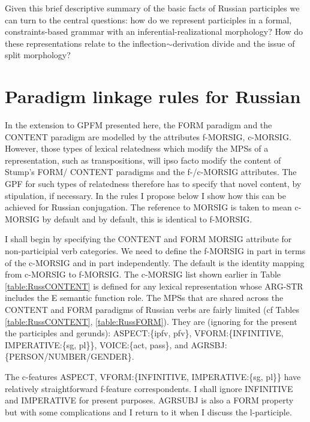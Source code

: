 \documentclass[output=paper,
modfonts
]{LSP/langsci}
\begin{document}
Given this brief descriptive summary of the basic facts of Russian participles we can turn to the central questions: how do we represent participles in a formal, constraints-based grammar with an inferential-realizational morphology? How do these representations relate to the inflection$\sim$derivation divide and the issue of split morphology? 

\section{Paradigm linkage rules for Russian} \label{sec:Russparalink}


In the extension to GPFM presented here, the FORM  paradigm and the CONTENT paradigm are modelled by the attributes f-MORSIG, c-MORSIG. However, those types of lexical relatedness which modify the MPSs of a representation, such as transpositions, will ipso facto modify the content of Stump's FORM/ CONTENT paradigms and the f-/c-MORSIG attributes. The GPF for such types of relatedness therefore has to specify that novel content, by stipulation, if necessary. In the rules I propose below I show how this can be achieved for Russian conjugation. The reference to MORSIG is taken to mean c-MORSIG by default and by default, this is identical to f-MORSIG. 

\begin{sloppypar}	
I shall begin by specifying the CONTENT and FORM MORSIG attribute for non-participial verb categories.
We need to define the f-MORSIG in part in terms of the c-MORSIG and in part independently. The default is the identity mapping from c-MORSIG to f-MORSIG. The c-MORSIG list shown earlier in Table \ref{table:RussCONTENT} is defined for any lexical representation whose ARG-STR includes the E semantic function role.  The MPSs that are shared across the CONTENT and FORM paradigms of Russian verbs are fairly limited (cf Tables \ref{table:RussCONTENT}, \ref{table:RussFORM}). They are (ignoring for the present the participles and gerunds):  ASPECT:\{ipfv, pfv\}, VFORM:\{INFINITIVE, IMPERATIVE:\{sg, pl\}\}, VOICE:\{act, pass\}, and AGRSBJ:\{PERSON/NUMBER/GENDER\}. 
\end{sloppypar}

The c-features ASPECT, VFORM:\{INFINITIVE, IMPERATIVE:\{sg, pl\}\} have relatively straightforward f-feature correspondents. I shall ignore INFINITIVE and IMPERATIVE for present purposes. AGRSUBJ is also a FORM property but with some complications and I return to it  when I discuss the l-participle. 
\end{document}
